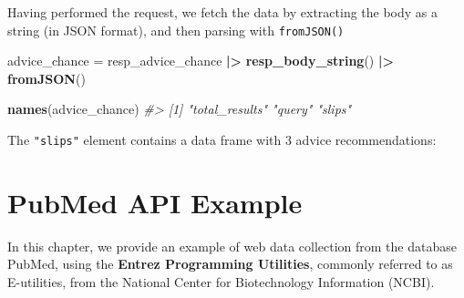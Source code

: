 \documentclass[
]{book}
\newenvironment{Shaded}{\begin{snugshade}}{\end{snugshade}}
\newcommand{\CommentTok}[1]{\textcolor[rgb]{0.56,0.35,0.01}{\textit{#1}}}
\newcommand{\FunctionTok}[1]{\textcolor[rgb]{0.13,0.29,0.53}{\textbf{#1}}}
\newcommand{\NormalTok}[1]{#1}
\newcommand{\OtherTok}[1]{\textcolor[rgb]{0.56,0.35,0.01}{#1}}
\newcommand{\SpecialCharTok}[1]{\textcolor[rgb]{0.81,0.36,0.00}{\textbf{#1}}}
\begin{document}
Having performed the request, we fetch the data by extracting the body as a
string (in JSON format), and then parsing with \texttt{fromJSON()}

\begin{Shaded}
\begin{Highlighting}[]
\NormalTok{advice\_chance }\OtherTok{=}\NormalTok{ resp\_advice\_chance }\SpecialCharTok{|\textgreater{}} \FunctionTok{resp\_body\_string}\NormalTok{() }\SpecialCharTok{|\textgreater{}} \FunctionTok{fromJSON}\NormalTok{()}

\FunctionTok{names}\NormalTok{(advice\_chance)}
\CommentTok{\#\textgreater{} [1] "total\_results" "query"         "slips" }
\end{Highlighting}
\end{Shaded}

The \texttt{"slips"} element contains a data frame with 3 advice recommendations:

\begin{Shaded}
\end{Shaded}

\hypertarget{api-pubmed}{%
\chapter{PubMed API Example}\label{api-pubmed}}

In this chapter, we provide an example of web data collection from the database
PubMed, using the \textbf{Entrez Programming Utilities}, commonly referred to as
E-utilities, from the National Center for Biotechnology Information (NCBI).
\end{document}
